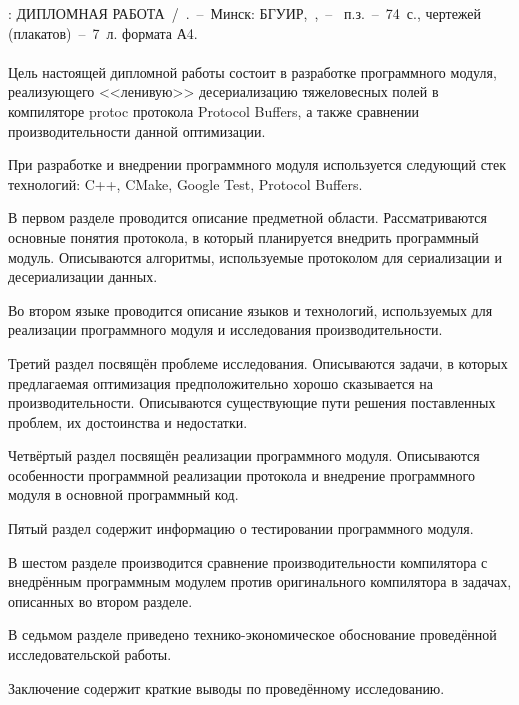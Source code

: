 
\noindent\MakeUppercase{\taskNameFull}: \MakeUppercase{Дипломная работа}~/~\studentShort.~--~Минск: БГУИР,~\targetYear,~--~ п.з.~--~74~с., чертежей (плакатов)~--~7~л. формата А4.
\\
\\
Цель настоящей дипломной работы состоит в разработке программного модуля, реализующего <<ленивую>> десериализацию тяжеловесных
полей в компиляторе protoc протокола Protocol Buffers, а также сравнении производительности данной оптимизации.

При разработке и внедрении программного модуля используется следующий стек технологий: C++, CMake, Google Test, Protocol Buffers.

В первом разделе проводится описание предметной области. Рассматриваются основные понятия протокола, в который планируется
внедрить программный модуль. Описываются алгоритмы, используемые протоколом для сериализации и десериализации данных.

Во втором языке проводится описание языков и технологий, используемых для реализации 
программного модуля и исследования производительности.

Третий раздел посвящён проблеме исследования. Описываются задачи, в которых
предлагаемая оптимизация предположительно хорошо сказывается на производительности.
Описываются существующие пути решения поставленных проблем, их достоинства и недостатки.

Четвёртый раздел посвящён реализации программного модуля. Описываются особенности программной реализации
протокола и внедрение программного модуля в основной программный код.

Пятый раздел содержит информацию о тестировании программного модуля.

В шестом разделе производится сравнение производительности компилятора с внедрённым программным модулем против оригинального компилятора в задачах, описанных во втором разделе.

В седьмом разделе приведено технико-экономическое обоснование проведённой исследовательской работы.

Заключение содержит краткие выводы по проведённому исследованию.

\thispagestyle{empty}

\clearpage
